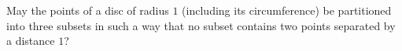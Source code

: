 May the points of a disc of radius $1$ (including its circumference) be partitioned into three subsets in such a way that no subset contains two points separated by a distance $1$?